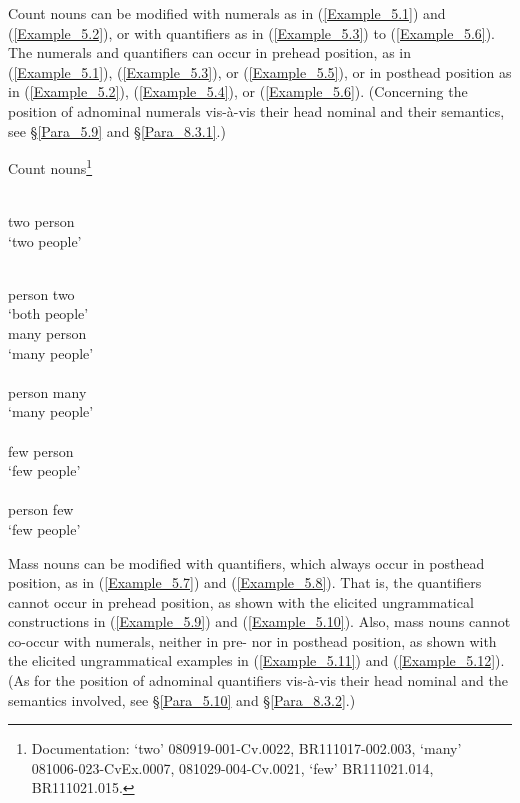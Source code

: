Count nouns can be modified with numerals as in (\ref{Example_5.1}) and (\ref{Example_5.2}), or with quantifiers as in (\ref{Example_5.3}) to (\ref{Example_5.6}). The numerals and quantifiers can occur in prehead position, as in (\ref{Example_5.1}), (\ref{Example_5.3}), or (\ref{Example_5.5}), or in posthead position as in (\ref{Example_5.2}), (\ref{Example_5.4}), or (\ref{Example_5.6}). (Concerning the position of adnominal numerals vis-à-vis their head nominal and their semantics, see §\ref{Para_5.9} and §\ref{Para_8.3.1}.)


\begin{styleExampleTitle}
Count nouns\footnote{Documentation:  ‘two’ 080919-001-Cv.0022, BR111017-002.003,  ‘many’ 081006-023-CvEx.0007, 081029-004-Cv.0021,  ‘few’ BR111021.014, BR111021.015.}
\end{styleExampleTitle}
 
\ea
\label{Example_5.1}
\gll {} \\ %
two person\\
\glt ‘two people’
\z

\ea
\label{Example_5.2}
\gll {} \\ %
person two  \\
\glt ‘both people’
\z 
\ea
\label{Example_5.3}
\gll {} \\ %
many person  \\
\glt ‘many people’\\
\z 
\ea
\label{Example_5.4}
\gll {} \\ %
person many  \\
\glt ‘many people’\\
\z 
\ea
\label{Example_5.5}
\gll {} \\ %
few person\\
\glt ‘few people’\\
\z 
\ea
\label{Example_5.6}
\gll {} \\ %
person few\\
\glt ‘few people’\\
\z 

Mass nouns can be modified with quantifiers, which always occur in posthead position, as in (\ref{Example_5.7}) and (\ref{Example_5.8}). That is, the quantifiers cannot occur in prehead position, as shown with the elicited ungrammatical constructions in (\ref{Example_5.9}) and (\ref{Example_5.10}). Also, mass nouns cannot co-occur with numerals, neither in pre- nor in posthead position, as shown with the elicited ungrammatical examples in (\ref{Example_5.11}) and (\ref{Example_5.12}). (As for the position of adnominal quantifiers vis-à-vis their head nominal and the semantics involved, see §\ref{Para_5.10} and §\ref{Para_8.3.2}.)



